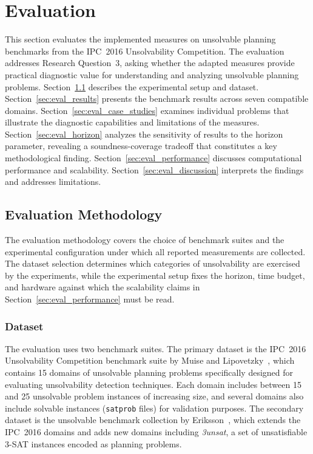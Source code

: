 \section{Evaluation}
\label{sec:evaluation}

This section evaluates the implemented measures on unsolvable planning benchmarks from the \ac{IPC}~2016 Unsolvability Competition. The evaluation addresses Research Question~3, asking whether the adapted measures provide practical diagnostic value for understanding and analyzing unsolvable planning problems. Section~\ref{sec:eval_methodology} describes the experimental setup and dataset. Section~\ref{sec:eval_results} presents the benchmark results across seven compatible domains. Section~\ref{sec:eval_case_studies} examines individual problems that illustrate the diagnostic capabilities and limitations of the measures. Section~\ref{sec:eval_horizon} analyzes the sensitivity of results to the horizon parameter, revealing a soundness-coverage tradeoff that constitutes a key methodological finding. Section~\ref{sec:eval_performance} discusses computational performance and scalability. Section~\ref{sec:eval_discussion} interprets the findings and addresses limitations.

\subsection{Evaluation Methodology}
\label{sec:eval_methodology}

The evaluation methodology covers the choice of benchmark suites and the experimental configuration under which all reported measurements are collected. The dataset selection determines which categories of unsolvability are exercised by the experiments, while the experimental setup fixes the horizon, time budget, and hardware against which the scalability claims in Section~\ref{sec:eval_performance} must be read.

\subsubsection{Dataset}

The evaluation uses two benchmark suites. The primary dataset is the \ac{IPC}~2016 Unsolvability Competition benchmark suite by Muise and Lipovetzky~\cite{Muise2016}, which contains 15 domains of unsolvable planning problems specifically designed for evaluating unsolvability detection techniques. Each domain includes between 15 and 25 unsolvable problem instances of increasing size, and several domains also include solvable instances (\texttt{satprob} files) for validation purposes. The secondary dataset is the unsolvable benchmark collection by Eriksson~\cite{Eriksson2019}, which extends the \ac{IPC}~2016 domains and adds new domains including \textit{3unsat}, a set of unsatisfiable 3-SAT instances encoded as planning problems.

